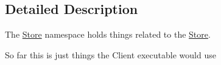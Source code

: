 \subsection{Detailed Description}
The \hyperlink{classAsteroids_1_1Domain_1_1Store_1_1Store}{Store} namespace holds things related to the \hyperlink{classAsteroids_1_1Domain_1_1Store_1_1Store}{Store}. 

So far this is just things the Client executable would use 